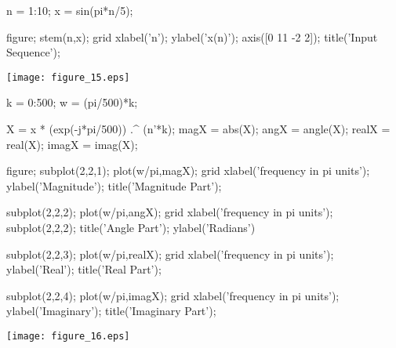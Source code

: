 \documentclass[12pt, onecolumn]{IEEEtran}
\begin{document}
	\begin{matlabcode}
		n = 1:10; 
		x = sin(pi*n/5);
		
		figure; stem(n,x); grid
		xlabel('n'); ylabel('x(n)');
		axis([0 11 -2 2]); title('Input Sequence');
	\end{matlabcode}
	\begin{center}
		\texttt{[image: figure\_15.eps]}
	\end{center}
	\begin{matlabcode}
		
		k = 0:500; %
		w = (pi/500)*k;  
		
		X = x * (exp(-j*pi/500)) .^ (n'*k); %
		magX = abs(X); angX = angle(X);
		realX = real(X); imagX = imag(X);
		
		figure; subplot(2,2,1); plot(w/pi,magX); grid
		xlabel('frequency in pi units'); ylabel('Magnitude');
		title('Magnitude Part'); 
		
		subplot(2,2,2); plot(w/pi,angX); grid
		xlabel('frequency in pi units'); subplot(2,2,2); 
		title('Angle Part'); ylabel('Radians')
		
		subplot(2,2,3); plot(w/pi,realX); grid
		xlabel('frequency in pi units');  ylabel('Real');
		title('Real Part');
		
		subplot(2,2,4); plot(w/pi,imagX); grid
		xlabel('frequency in pi units'); ylabel('Imaginary');
		title('Imaginary Part'); 
	\end{matlabcode}
	\begin{center}
		\texttt{[image: figure\_16.eps]}
	\end{center}
	
\end{document}
